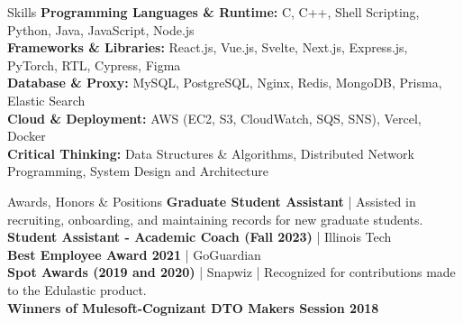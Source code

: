 \documentclass{resume} %
\begin{document}
\vspace{-5pt}
\begin{rSection}{Skills}
   \small \textbf{Programming Languages \& Runtime:} C, C++, Shell Scripting, Python, Java, JavaScript, Node.js \\
   \small \textbf{Frameworks \& Libraries:} React.js, Vue.js, Svelte, Next.js, Express.js, PyTorch, RTL, Cypress, Figma \\
   \small \textbf{Database \& Proxy:} MySQL, PostgreSQL, Nginx, Redis, MongoDB, Prisma, Elastic Search \\
   \small \textbf{Cloud \& Deployment:} AWS (EC2, S3, CloudWatch, SQS, SNS), Vercel, Docker \\
   \small \textbf{Critical Thinking:} Data Structures \& Algorithms, Distributed Network Programming, System Design and Architecture
\end{rSection}

\vspace{-6pt}
\begin{rSection}{Awards, Honors \& Positions}
   \small \textbf{Graduate Student Assistant} | Assisted in recruiting, onboarding, and maintaining records for new graduate students. \\
   \small \textbf{Student Assistant - Academic Coach (Fall 2023)} | Illinois Tech \\
   \small \textbf{Best Employee Award 2021} | GoGuardian \\
   \small \textbf{Spot Awards (2019 and 2020)} | Snapwiz |  Recognized for contributions made to the Edulastic product. \\
   \small \textbf{Winners of Mulesoft-Cognizant DTO Makers Session 2018}
\end{rSection}

\end{document}

